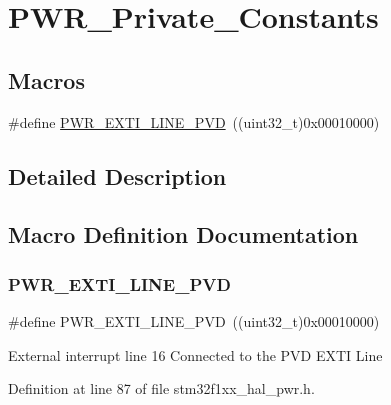 \hypertarget{group___p_w_r___private___constants}{}\section{P\+W\+R\+\_\+\+Private\+\_\+\+Constants}
\label{group___p_w_r___private___constants}
\subsection*{Macros}
\begin{DoxyCompactItemize}
\item 
\#define \hyperlink{group___p_w_r___private___constants_ga43a49255649e03d2d2b6b12c5c379d2b}{P\+W\+R\+\_\+\+E\+X\+T\+I\+\_\+\+L\+I\+N\+E\+\_\+\+P\+VD}~((uint32\+\_\+t)0x00010000)
\end{DoxyCompactItemize}


\subsection{Detailed Description}


\subsection{Macro Definition Documentation}
\mbox{\label{group___p_w_r___private___constants_ga43a49255649e03d2d2b6b12c5c379d2b}} 
\subsubsection{\texorpdfstring{P\+W\+R\+\_\+\+E\+X\+T\+I\+\_\+\+L\+I\+N\+E\+\_\+\+P\+VD}{PWR\_EXTI\_LINE\_PVD}}
{\footnotesize\ttfamily \#define P\+W\+R\+\_\+\+E\+X\+T\+I\+\_\+\+L\+I\+N\+E\+\_\+\+P\+VD~((uint32\+\_\+t)0x00010000)}

External interrupt line 16 Connected to the P\+VD E\+X\+TI Line 

Definition at line 87 of file stm32f1xx\+\_\+hal\+\_\+pwr.\+h.


